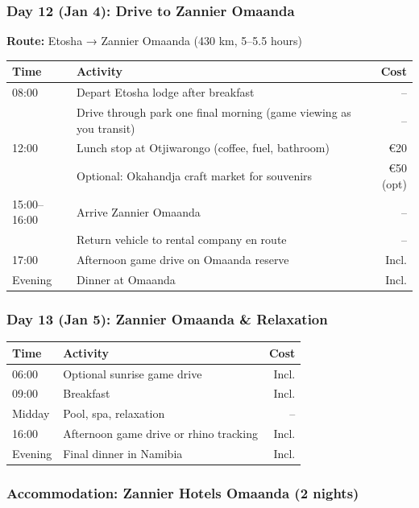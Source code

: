 \documentclass[11pt]{article}
\begin{document}
\subsubsection{Day 12 (Jan 4): Drive to Zannier Omaanda}

\textbf{Route:} Etosha → Zannier Omaanda (430 km, 5--5.5 hours)

\begin{tabular}{llr}
\toprule
\textbf{Time} & \textbf{Activity} & \textbf{Cost} \\
\midrule
08:00 & Depart Etosha lodge after breakfast & -- \\
& Drive through park one final morning (game viewing as you transit) & -- \\
12:00 & Lunch stop at Otjiwarongo (coffee, fuel, bathroom) & €20 \\
& Optional: Okahandja craft market for souvenirs & €50 (opt) \\
15:00--16:00 & Arrive Zannier Omaanda & -- \\
& Return vehicle to rental company en route & -- \\
17:00 & Afternoon game drive on Omaanda reserve & Incl. \\
Evening & Dinner at Omaanda & Incl. \\
\bottomrule
\end{tabular}

\subsubsection{Day 13 (Jan 5): Zannier Omaanda \& Relaxation}

\begin{tabular}{llr}
\toprule
\textbf{Time} & \textbf{Activity} & \textbf{Cost} \\
\midrule
06:00 & Optional sunrise game drive & Incl. \\
09:00 & Breakfast & Incl. \\
Midday & Pool, spa, relaxation & -- \\
16:00 & Afternoon game drive or rhino tracking & Incl. \\
Evening & Final dinner in Namibia & Incl. \\
\bottomrule
\end{tabular}

\subsubsection{Accommodation: Zannier Hotels Omaanda (2 nights)}
\end{document}
